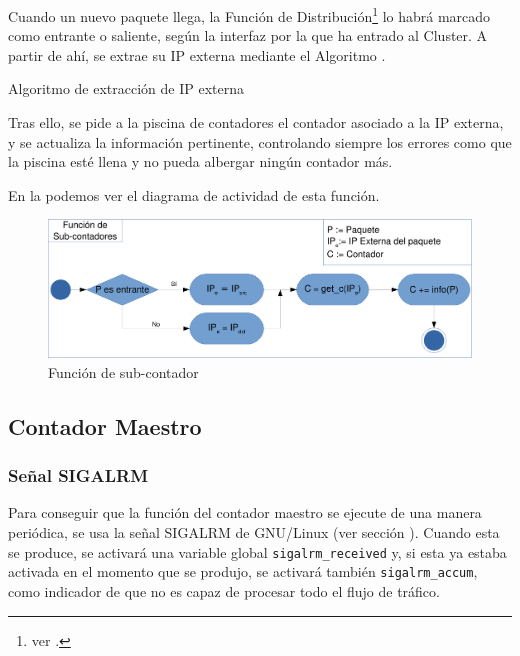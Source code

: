 Cuando un nuevo paquete llega, la Función de Distribución\footnote{ver .} lo habrá marcado como 
entrante o saliente, según la interfaz por la que ha entrado al Cluster. A partir de ahí, se extrae su \gls{IP} externa 
mediante el Algoritmo .

\begin{algorithm}[htbp]
 \caption{Algoritmo de extracción de IP externa}
\end{algorithm}

Tras ello, se pide a la piscina de contadores el contador asociado a la IP externa, y se actualiza la información 
pertinente, controlando siempre los errores como que la piscina esté llena y no pueda albergar ningún contador más.

En la  podemos ver el diagrama de actividad de esta función.

\begin{figure}[htbp]
\centering
\includegraphics[width=\textwidth]{CapituloEstructura/Figuras/ActividadFuncionContador-crop}
\caption{Función de sub-contador}
\end{figure}
%

\subsection{Contador Maestro}
\subsubsection{Señal SIGALRM}
Para conseguir que la función del contador maestro se ejecute de una manera periódica, se usa la señal 
SIGALRM de GNU/Linux (ver sección ). Cuando esta se produce, 
se activará una variable global \texttt{sigalrm\_received} y, si esta ya estaba activada en el momento que se produjo, 
se activará también \texttt{sigalrm\_accum}, como indicador de que \redborderddos{} no es capaz de procesar todo el 
flujo de tráfico.

